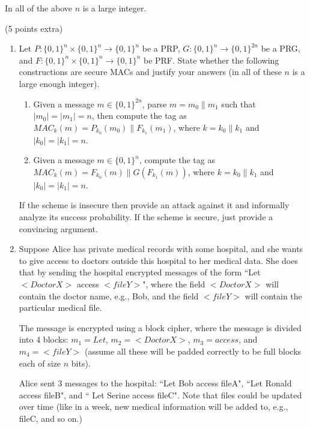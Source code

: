\documentclass[12pt]{article}
\newcommand{\zo}{\{0,1\}}
\newcommand*\concat{\mathbin{\|}}
\begin{document}
 In all of the above $n$ is a large integer.\newline


\newpage
{} (5 points extra)\\
\vspace{-15pt}
\begin{enumerate}
    \item Let $P: \zo^n \times \zo^n \rightarrow \zo^{n}$ be a PRP, $G: \zo^n \rightarrow \zo^{2n}$ be a PRG, and $F: \zo^n \times \zo^n \rightarrow \zo^n$ be PRF. State whether the following constructions are secure MACs and justify your answers (in all of these $n$ is a large enough integer).  

    \begin{enumerate}
        \item Given a message $m \in \zo^{2n}$, parse $m = m_0 \concat m_1$ such that $|m_0| = |m_1| = n$, then compute the tag as $MAC_k(m) = P_{k_0}(m_0) \concat F_{k_1}(m_1)$, where $k = k_0 \concat k_1$ and $|k_0| = |k_1| = n$.  

        \item Given a message $m \in \zo^{n}$, compute the tag as $MAC_k(m) = F_{k_0}(m) \concat G(F_{k_1}(m))$, where $k = k_0 \concat k_1$ and $|k_0| = |k_1| = n$. 
    \end{enumerate}
  If the scheme is insecure then provide an attack against it and informally analyze its success probability. If the scheme is secure, just provide a convincing argument.
 
    \item Suppose Alice has private medical records with some hospital, and she wants to give access to doctors outside this hospital to her medical data. She does that by sending the hospital encrypted messages of the form ``Let $<DoctorX>$ access $<file Y>$", where the field $<DoctorX>$ will contain the doctor name, e.g., Bob, and the field $<file Y>$ will contain the particular medical file. 
    
    The message is encrypted using a block cipher, where the message is divided into 4 blocks: $m_1 = Let$, $m_2 = <DoctorX>$, $m_3 = access$, and $m_4 = <file Y>$ (assume all these will be padded correctly to be full blocks each of size $n$ bits).

    Alice sent 3 messages to the hospital: ``Let Bob access fileA", ``Let Ronald access fileB", and `` Let Serine access fileC". Note that files could be updated over time (like in a week, new medical information will be added to, e.g., fileC, and so on.)


\end{enumerate}
\end{document}
